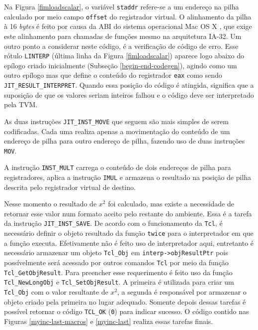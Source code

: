 Na Figura \ref{fimloadscalar}, o variável \verb!staddr!
refere-se a um endereço na pilha calculado por meio campo
\verb!offset! do registrador virtual. O alinhamento da pilha à 16
\textit{bytes} é feito por causa da ABI do sistema operacional Mac OS
X \cite{macosx-abi}, que exige este alinhamento para chamadas de
funções mesmo na arquitetura IA-32. Um outro ponto a considerar neste
código, é a verificação de código de erro. Esse rótulo \verb!LINTERP!
(última linha da Figura \ref{fimloadscalar})
aparece logo abaixo do epílogo criado inicialmente (Subseção
\ref{begin-end-codegen}), agindo como um
outro epílogo mas que define o conteúdo do registrador \verb!eax! como
sendo \verb!JIT_RESULT_INTERPRET!. Quando essa posição do código é
atingida, significa que a suposição de que os valores seriam inteiros
falhou e o código deve ser interpretado pela TVM.

As duas instruções \verb!JIT_INST_MOVE! que seguem são mais simples de
serem codificadas. Cada uma realiza apenas a movimentação do conteúdo de
um endereço de pilha para outro endereço de pilha, fazendo uso de duas
instruções \verb!MOV!.

A instrução \verb!INST_MULT! carrega o conteúdo de dois endereços de
pilha para registradores, aplica a instrução \verb!IMUL! e
armazena o resultado na posição de pilha descrita pelo registrador
virtual de destino.

Nesse momento o resultado de $x^2$ foi calculado, mas existe a
necessidade de retornar esse valor num formato aceito pelo restante do
ambiente. Essa é a tarefa da instrução \verb!JIT_INST_SAVE!.
De acordo com o funcionamento da \texttt{Tcl}, é
necessário definir o objeto resultado da função \verb!twice! para o
interpretador em que a função executa. Efetivamente não é feito
uso de interpretador aqui, entretanto é necessário armazenar
um objeto \verb!Tcl_Obj! em \verb!interp->objResultPtr! pois possívelmente será acessado
por outros comandos \texttt{Tcl} por meio da função \verb!Tcl_GetObjResult!.
Para preencher esse requerimento é feito uso da função
\verb!Tcl_NewLongObj! e \verb!Tcl_SetObjResult!. A primeira é
utilizada para criar um \verb!Tcl_Obj! com o valor resultante de
$x^2$, a segunda é responsável por armazenar o objeto criado pela
primeira no lugar adequado.
Somente depois dessas tarefas é possível
retornar o código \verb!TCL_OK! (\verb!0!) para indicar sucesso.
O código contido nas Figuras \ref{myinc-last-macros} e \ref{myinc-last}
realiza essas tarefas finais.

